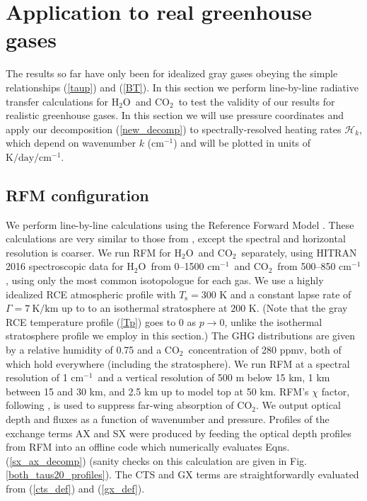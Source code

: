 \documentclass{ametsoc}
\newcommand{\eqnref}[1]{(\ref{#1})}
\newcommand{\Kelvin}{\ensuremath{\mathrm{K}}}
\newcommand{\km}{\ensuremath{\mathrm{km}}}
\newcommand{\cminverse}{\ensuremath{\mathrm{cm^{-1}}}}
\newcommand{\Ts}{\ensuremath{T_\mathrm{s}}}
\newcommand{\cotwo}{\ensuremath{\mathrm{CO_2}}}
\newcommand{\htwo}{\ensuremath{\mathrm{H_2O}}}
\newcommand{\ch}{\ensuremath{\mathcal{H}}}
\newcommand{\chk}{\ensuremath{\ch_k}}
\begin{document}
\section{Application to real greenhouse gases} \label{sec_rfm_calcs}
The results so far have only been for idealized gray gases obeying the simple relationships \eqnref{taup} and \eqnref{BT}. In this section we perform line-by-line radiative transfer calculations for \htwo\ and \cotwo\ to test the validity of our results for realistic greenhouse gases. In this section we will use pressure coordinates and apply our decomposition \eqnref{new_decomp} to spectrally-resolved heating rates \chk, which depend on wavenumber $k$ (\cminverse) and will be plotted in  units of $\Kelvin/\mathrm{day}/\cminverse$.

\subsection{RFM configuration}
We perform line-by-line calculations using the Reference Forward Model  \citep[RFM,][]{dudhia2017}. These calculations are very similar to those from \cite{jeevanjee2019a}, except the spectral and horizontal resolution is coarser. We run RFM for \htwo\ and \cotwo\ separately, using  HITRAN 2016 spectroscopic data for \htwo\ from 0--1500 \cminverse\ and \cotwo\ from 500--850 \cminverse, using only the most common isotopologue for each gas. We use a highly idealized RCE atmospheric profile with $\Ts= 300$ K and a constant lapse rate of $\Gamma= 7\ \Kelvin/\km$ up to to an isothermal stratosphere at $200$ K. (Note that the gray RCE temperature profile \eqnref{Tp} goes to 0 as $p\rightarrow 0$, unlike the isothermal stratosphere profile we employ in this section.) The GHG distributions are given by a relative humidity of 0.75 and a  \cotwo\ concentration of 280 ppmv, both of which hold everywhere (including the stratosphere).   We run RFM at a spectral resolution of 1 \cminverse\ and a vertical resolution of 500 m below 15 km, 1 km between 15 and 30 km, and 2.5 km up to model top at 50 km. RFM's $\chi$ factor, following \cite{cousin1985}, is used to suppress far-wing absorption of \cotwo. We output optical depth and fluxes as a function of wavenumber and pressure. Profiles of the exchange terms AX and SX  were produced by feeding the optical depth profiles from RFM into an offline code which numerically evaluates  Eqns. \eqnref{sx_ax_decomp} (sanity checks on this calculation are given in Fig. \ref{both_taus20_profiles}). The CTS and GX terms are straightforwardly evaluated from \eqnref{cts_def} and \eqnref{gx_def}. 
\end{document}

